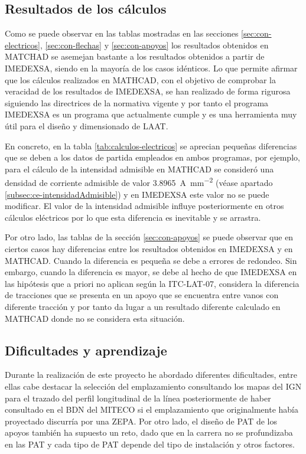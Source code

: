 \subsection{Resultados de los cálculos}
\label{subsec:con-resultados}
Como se puede observar en las tablas mostradas en las secciones \ref{sec:con-electricos}, \ref{sec:con-flechas} y \ref{sec:con-apoyos} los resultados obtenidos en MATCHAD se asemejan bastante a los resultados obtenidos a partir de IMEDEXSA, siendo en la mayoría de los casos idénticos. Lo que permite afirmar que los cálculos realizados en MATHCAD, con el objetivo de comprobar la veracidad de los resultados de IMEDEXSA, se han realizado de forma rigurosa siguiendo las directrices de la normativa vigente y por tanto el programa IMEDEXSA es un programa que actualmente cumple y es una herramienta muy útil para el diseño y dimensionado de \ac{LAAT}.

En concreto, en la tabla \ref{tab:calculos-electricos} se aprecian pequeñas diferencias que se deben a los datos de partida empleados en ambos programas, por ejemplo, para el cálculo de la intensidad admisible en MATHCAD se consideró una densidad de corriente admisible de valor \SI{3.8965}{\ampere\per\milli\meter\squared} (véase apartado \ref{subsec:ce-intensidadAdmisible}) y en IMEDEXSA este valor no se puede modificar. El valor de la intensidad admisible influye posteriormente en otros cálculos eléctricos por lo que esta diferencia es inevitable y se arrastra.

Por otro lado, las tablas de la sección \ref{sec:con-apoyos}  se puede observar que en ciertos casos hay diferencias entre los resultados obtenidos en IMEDEXSA y en MATHCAD. Cuando la diferencia es pequeña se debe a errores de redondeo. Sin embargo, cuando la diferencia es mayor, se debe al hecho de que IMEDEXSA en las hipótesis que a priori no aplican según la ITC-LAT-07, considera la diferencia de tracciones que se presenta en un apoyo que se encuentra entre vanos con diferente tracción y por tanto da lugar a un resultado diferente calculado en MATHCAD donde no se considera esta situación.
\subsection{Dificultades y aprendizaje}
\label{subsec:con-dificultades}
Durante la realización de este proyecto he abordado diferentes dificultades, entre ellas cabe destacar la selección del emplazamiento consultando los mapas del \ac{IGN} \cite{IGN_CentroDescargas} para el trazado del perfil longitudinal de la línea posteriormente de haber consultado en el \ac{BDN} del \ac{MITECO} \cite{MITECO_BancoDatosNaturaleza} si el emplazamiento que originalmente había proyectado discurría por una \ac{ZEPA}. Por otro lado, el diseño de \ac{PAT} de los apoyos también ha supuesto un reto, dado que en la carrera no se profundizaba en las \ac{PAT} y cada tipo de \ac{PAT} depende del tipo de instalación y otros factores.

